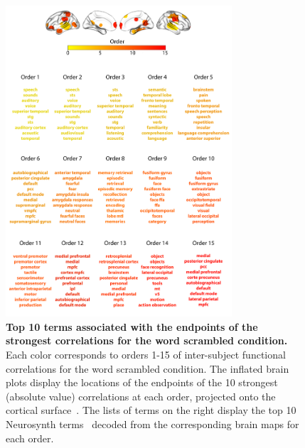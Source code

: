 \documentclass{article}
\begin{document}
\begin{figure}[p!]
\centering
\includegraphics[width=0.75\textwidth]{figs/supp_15_word}
\caption{\textbf{Top 10 terms associated with the endpoints of the
      strongest correlations for the word scrambled condition.}  Each color corresponds to orders 1-15 of
    inter-subject functional correlations for the word scrambled condition. The inflated brain plots
    display the locations of the endpoints of the 10 strongest
    (absolute value) correlations at each order, projected onto the
    cortical surface~\citep{CombEtal19}.  The lists of terms on the
    right display the top 10 Neurosynth terms~\citep{RubiEtal17}
    decoded from the corresponding brain maps for each order.}
\label{fig:word}
\end{figure}
\end{document}
